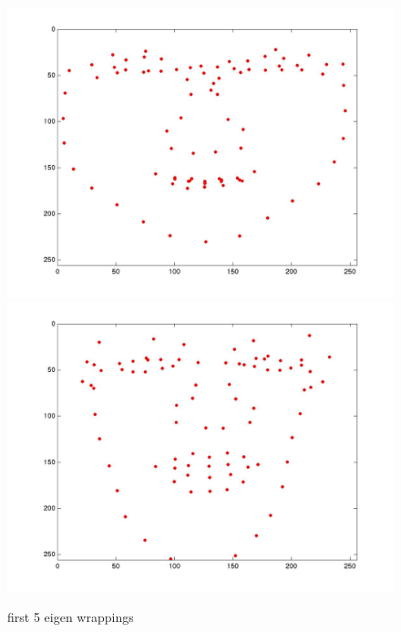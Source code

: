 \documentclass[12pt]{ctexart}
\begin{document}
\begin{enumerate}
\begin{figure}[H]
  \includegraphics[scale=0.15]{b_eigenlm4.jpg} 
  \includegraphics[scale=0.15]{b_eigenlm5.jpg} 
  \caption{first 5 eigen wrappings}
\end{figure}


\end{enumerate}
\end{document}
